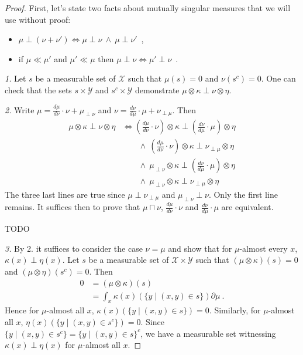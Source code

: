 \begin{proof}%
\uses{}
First, let's state two facts about mutually singular measures that we will use without proof:
\begin{itemize}
  \item $\mu \perp (\nu + \nu') \iff \mu \perp \nu \ \wedge \ \mu \perp \nu'$~,
  \item if $\mu \ll \mu'$ and  $\mu' \ll \mu$ then $\mu \perp \nu \iff \mu' \perp \nu$~.
\end{itemize}

\emph{1.} Let $s$ be a measurable set of $\mathcal X$ such that $\mu(s) = 0$ and $\nu(s^c) = 0$. One can check that the sets $s \times \mathcal Y$ and $s^c \times \mathcal Y$ demonstrate $\mu \otimes \kappa \perp \nu \otimes \eta$.

\emph{2.} Write $\mu = \frac{d \mu}{d \nu} \cdot \nu + \mu_{\perp \nu}$ and $\nu = \frac{d \nu}{d \mu} \cdot \mu + \nu_{\perp \mu}$.
Then
\begin{align*}
\mu \otimes \kappa \perp \nu \otimes \eta
&\iff \left(\frac{d \mu}{d \nu} \cdot \nu\right) \otimes \kappa \perp \left(\frac{d \nu}{d \mu} \cdot \mu\right) \otimes \eta
\\&\qquad \wedge \ \left(\frac{d \mu}{d \nu} \cdot \nu\right) \otimes \kappa \perp \nu_{\perp \mu} \otimes \eta
\\&\qquad \wedge \ \mu_{\perp \nu} \otimes \kappa \perp \left(\frac{d \nu}{d \mu} \cdot \mu\right) \otimes \eta
\\&\qquad \wedge \ \mu_{\perp \nu} \otimes \kappa \perp \nu_{\perp \mu} \otimes \eta
\end{align*}
The three last lines are true since $\mu \perp \nu_{\perp \mu}$ and $\mu_{\perp \nu} \perp \nu$. Only the first line remains.
It suffices then to prove that $\mu \sqcap \nu$, $\frac{d \mu}{d \nu} \cdot \nu$ and $\frac{d \nu}{d \mu} \cdot \mu$ are equivalent.

TODO

\emph{3.} By 2. it suffices to consider the case $\nu = \mu$ and show that for $\mu$-almost every $x$, $\kappa(x) \perp \eta(x)$.
Let $s$ be a measurable set of $\mathcal X \times \mathcal Y$ such that $(\mu \otimes \kappa)(s) = 0$ and $(\mu \otimes \eta)(s^c) = 0$.
Then
\begin{align*}
0 &= (\mu \otimes \kappa)(s)
\\
&= \int_{x} \kappa(x)(\{y \mid (x, y) \in s\}) \partial \mu
\: .
\end{align*}
Hence for $\mu$-almost all $x$, $\kappa(x)(\{y \mid (x, y) \in s\}) = 0$. Similarly, for $\mu$-almost all $x$, $\eta(x)(\{y \mid (x, y) \in s^c\}) = 0$. Since $\{y \mid (x, y) \in s^c\} = \{y \mid (x, y) \in s\}^c$, we have a measurable set witnessing $\kappa(x) \perp \eta(x)$ for $\mu$-almost all $x$.
\end{proof}



